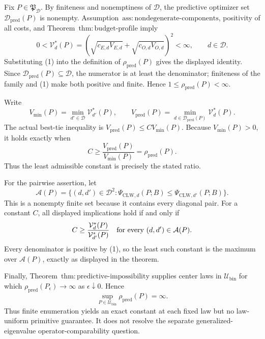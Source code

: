 Fix \(P\in\mathfrak P_{\mathcal D}\).  By finiteness and nonemptiness of \(\mathcal D\), the predictive optimizer set \(\mathcal D_{\mathrm{pred}}(P)\) is nonempty.  Assumption~\(\mathrm{ass{:}nondegenerate\text{-}components}\), positivity of all costs, and Theorem~\(\mathrm{thm{:}budget\text{-}profile}\) imply
\[
 0<\mathcal V_d^*(P)
 =(\sqrt{c_{E,d}V_{E,d}}+\sqrt{c_{O,d}V_{O,d}})^2<\infty,
 \qquad d\in\mathcal D.                                    \tag{1}
\]
Substituting (1) into the definition of \(\rho_{\mathrm{pred}}(P)\) gives the displayed identity. Since \(\mathcal D_{\mathrm{pred}}(P)\subseteq\mathcal D\), the numerator is at least the denominator; finiteness of the family and (1) make both positive and finite. Hence \(1\le\rho_{\mathrm{pred}}(P)<\infty\).

Write
\[
 V_{\min}(P)=\min_{d'\in\mathcal D}\mathcal V_{d'}^*(P),
 \qquad
 V_{\mathrm{pred}}(P)
 =\min_{d\in\mathcal D_{\mathrm{pred}}(P)}\mathcal V_d^*(P).
\]
The actual best-tie inequality is \(V_{\mathrm{pred}}(P)\le C V_{\min}(P)\). Because \(V_{\min}(P)>0\), it holds exactly when
\[
 C\ge \frac{V_{\mathrm{pred}}(P)}{V_{\min}(P)}
 =\rho_{\mathrm{pred}}(P).                                 \tag{2}
\]
Thus the least admissible constant is precisely the stated ratio.

For the pairwise assertion, let
\[
 \mathcal A(P)=\{(d,d')\in\mathcal D^2:
 \Psi_{\mathrm{CLW},d}(P;B)
 \le\Psi_{\mathrm{CLW},d'}(P;B)\}.
\]
This is a nonempty finite set because it contains every diagonal pair. For a constant \(C\), all displayed implications hold if and only if
\[
 C\ge\frac{\mathcal V_d^*(P)}{\mathcal V_{d'}^*(P)}
 \quad\hbox{for every }(d,d')\in\mathcal A(P).
\]
Every denominator is positive by (1), so the least such constant is the maximum over \(\mathcal A(P)\), exactly as displayed in the theorem.

Finally, Theorem~\(\mathrm{thm{:}predictive\text{-}impossibility}\) supplies center laws in \(\mathcal U_{\mathrm{bin}}\) for which \(\rho_{\mathrm{pred}}(P_\epsilon)\to\infty\) as \(\epsilon\downarrow0\). Hence
\[
 \sup_{P\in\mathcal U_{\mathrm{bin}}}\rho_{\mathrm{pred}}(P)=\infty.
\]
Thus finite enumeration yields an exact constant at each fixed law but no law-uniform primitive guarantee. It does not resolve the separate generalized-eigenvalue operator-comparability question.